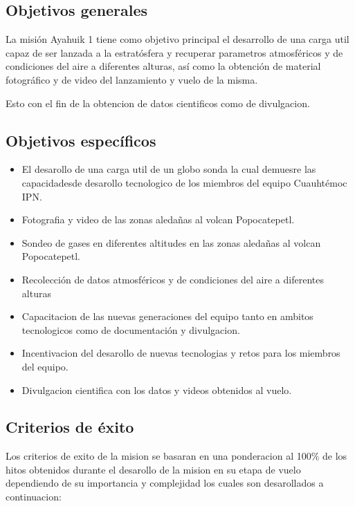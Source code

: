 \documentclass[letterpaper,12pt]{article} %
\begin{document}
    \subsection{Objetivos generales}
    La misión Ayahuik 1 tiene como objetivo principal el desarrollo de una carga util capaz de ser lanzada a la estratósfera
    y recuperar parametros atmosféricos y de condiciones del aire a diferentes alturas,
    así como la obtención de material fotográfico y de video del lanzamiento y vuelo de la misma.


    Esto con el fin de la obtencion de datos cientificos como de divulgacion.

    \subsection{Objetivos específicos}
    \begin{itemize}
        \item El desarollo de una carga util de un globo sonda la cual demuesre las capacidadesde desarollo tecnologico de los miembros del equipo Cuauhtémoc IPN.
        \item Fotografia y video de las zonas aledañas al volcan Popocatepetl.
        \item Sondeo de gases en diferentes altitudes en las zonas aledañas al volcan Popocatepetl.
        \item Recolección de datos atmosféricos y de condiciones del aire a diferentes alturas
        \item Capacitacion de las nuevas generaciones del equipo tanto en ambitos tecnologicos como de documentación y divulgacion.
        \item Incentivacion del desarollo de nuevas tecnologias y retos para los miembros del equipo.
        \item Divulgacion cientifica con los datos y videos obtenidos al vuelo.
        
    \end{itemize}    

    \newpage
    
    \subsection{Criterios de éxito}

    Los criterios de exito de la mision se basaran en una ponderacion al 100\% de los hitos obtenidos durante el desarollo de la mision en su etapa de vuelo dependiendo de su importancia y complejidad los cuales son desarollados a continuacion:
\end{document}
